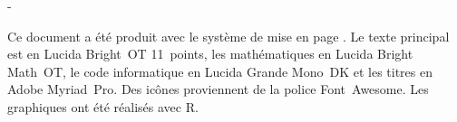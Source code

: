 
\vspace*{\fill}

\begingroup
\calccentering{\unitlength}
\begin{adjustwidth*}{\unitlength}{-\unitlength}
  \begin{flushleft}
    \small %
    Ce document a été produit avec le système de mise en page
    {\XeLaTeX}. Le texte principal est en Lucida Bright~OT 11~points,
    les mathématiques en Lucida Bright Math~OT, le code informatique
    en Lucida Grande Mono~DK et les titres en Adobe Myriad~Pro. Des
    icônes proviennent de la police Font~Awesome. Les graphiques ont
    été réalisés avec R.
  \end{flushleft}
\end{adjustwidth*}
\endgroup
\vfill
